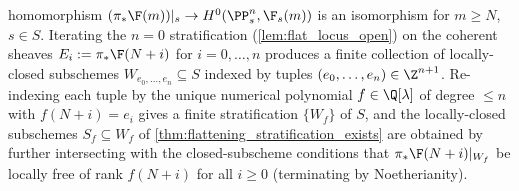 \begin{lemma}
  homomorphism \((\pi_* \F(m))|_s \to H^0(\PP^n_s, \F_s(m))\) is an isomorphism
  for \(m \ge N\), \(s \in S\).  Iterating the \(n=0\) stratification
  (\cref{lem:flat_locus_open}) on the coherent sheaves \(E_i := \pi_* \F(N+i)\)
  for \(i = 0, \dots, n\) produces a finite collection of locally-closed
  subschemes \(W_{e_0, \dots, e_n} \subseteq S\) indexed by tuples
  \((e_0, \dots, e_n) \in \Z^{n+1}\). Re-indexing each tuple by the unique
  numerical polynomial \(f \in \Q[\lambda]\) of degree \(\le n\) with
  \(f(N+i) = e_i\) gives a finite stratification \(\{W_f\}\) of \(S\), and the
  locally-closed subschemes \(S_f \subseteq W_f\) of
  \cref{thm:flattening_stratification_exists} are obtained by further
  intersecting with the closed-subscheme conditions that
  \(\pi_* \F(N+i)|_{W_f}\) be locally free of rank \(f(N+i)\) for all \(i \ge 0\)
  (terminating by Noetherianity).
\end{lemma}

